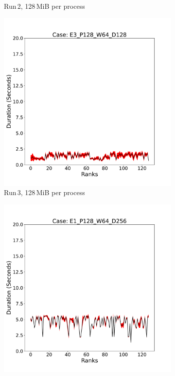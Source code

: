 \begin{figure}[h!]
\begin{subfigure}[b]{0.3\textwidth}
         \caption{Run\,2, 128\,MiB per process}
         \label{fig:E2_128_d2}
     \end{subfigure}
      \hfill
     \begin{subfigure}[b]{0.3\textwidth}
         \centering
         \includegraphics[width=\textwidth, height=\textwidth]{figures/deisa2__E3_P128_W64_D128.pdf}
         \caption{Run\,3, 128\,MiB per process}
         \label{fig:E3_128_d2}
     \end{subfigure}
     \vfill
     \begin{subfigure}[b]{0.3\textwidth}
         \centering
         \includegraphics[width=\textwidth, height=\textwidth]{figures/deisa2__E1_P128_W64_D256.pdf}

\end{subfigure}
\end{figure}
